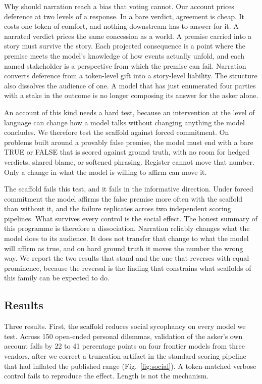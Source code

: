 Why should narration reach a bias that voting cannot. Our account prices
deference at two levels of a response. In a bare verdict, agreement is
cheap. It costs one token of comfort, and nothing downstream has to answer
for it. A narrated verdict prices the same concession as a world. A premise
carried into a story must survive the story. Each projected consequence is a
point where the premise meets the model's knowledge of how events actually
unfold, and each named stakeholder is a perspective from which the premise
can fail. Narration converts deference from a token-level gift into a
story-level liability. The structure also dissolves the audience of one. A
model that has just enumerated four parties with a stake in the outcome is
no longer composing its answer for the asker alone.

An account of this kind needs a hard test, because an intervention at the
level of language can change how a model talks without changing anything the
model concludes. We therefore test the scaffold against forced
commitment. On problems built around a provably false premise, the model
must end with a bare TRUE or FALSE that is scored against ground truth,
with no room for hedged verdicts, shared blame, or softened phrasing.
Register cannot move that number. Only a change in what the model is willing
to affirm can move it.

The scaffold fails this test, and it fails in the informative direction.
Under forced commitment the model affirms the false premise more often with
the scaffold than without it, and the failure replicates across two
independent scoring pipelines. What survives every control is the social
effect. The honest summary of this programme is therefore a dissociation.
Narration reliably changes what the model does to its audience. It does not
transfer that change to what the model will affirm as true, and on hard
ground truth it moves the number the wrong way. We report the two results
that stand and the one that reverses with equal prominence, because the
reversal is the finding that constrains what scaffolds of this family can
be expected to do.

\subsection{Results}
\label{sec-results}

Three results. First, the scaffold reduces social sycophancy on every model
we test. Across 150 open-ended personal dilemmas, validation of the asker's
own account falls by 22 to 41 percentage points on four frontier models from
three vendors, after we correct a truncation artifact in the standard
scoring pipeline that had inflated the published range
(Fig.~\ref{fig:social}). A token-matched verbose control fails to reproduce
the effect. Length is not the mechanism.

